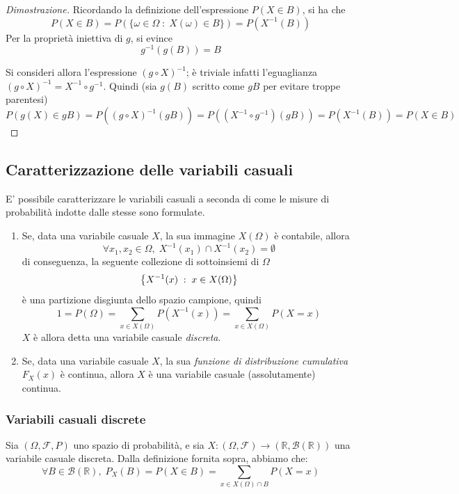 \documentclass{article}
\begin{document}
        \begin{proof}[Dimostrazione]
            Ricordando la definizione dell'espressione $P(X \in B)$, si ha che
            \[
                P(X \in B) = P(\{ \omega \in \Omega \; : \; X(\omega) \in B \}) = P(X^{-1}(B))
            \]
            Per la proprietà iniettiva di $g$, si evince
            \[
                g^{-1}(g(B)) = B
            \]

            Si consideri allora l'espressione $(g \circ X)^{-1}$; è triviale infatti l'eguaglianza $(g \circ X)^{-1} = X^{-1} \circ g^{-1}$. 
            Quindi (sia $g(B)$ scritto come $gB$ per evitare troppe parentesi)
            \[
                P(g(X) \in gB) = P((g \circ X)^{-1}(gB)) = P((X^{-1} \circ g^{-1}) (gB)) = P(X^{-1}(B)) = P(X \in B)
            \]
        \end{proof}


        \subsection{Caratterizzazione delle variabili casuali}
            E' possibile caratterizzare le variabili casuali a seconda di come le misure di probabilità indotte dalle stesse sono formulate.

            \begin{enumerate}
                \item Se, data una variabile casuale $X$, la sua immagine $X(\Omega)$ è contabile, allora
                \[
                    \forall x_1, x_2 \in \Omega, \; X^{-1}(x_1) \cap X^{-1}(x_2) = \emptyset
                \]
                di conseguenza, la seguente collezione di sottoinsiemi di $\Omega$
                \[
                    \qty{X^{-1}(x) \; : \; x \in X(\Omega)}
                \]
                è una partizione disgiunta dello spazio campione, quindi
                \[
                    1 = P(\Omega) = \sum_{x \in X(\Omega)} P(X^{-1}(x)) = \sum_{x \in X(\Omega)} P(X = x)
                \]
                $X$ è allora detta una variabile casuale \textit{discreta}.

                \item Se, data una variabile casuale $X$, la sua \textit{funzione di distribuzione cumulativa} $F_{X}(x)$ è continua, allora $X$ è una variabile casuale (assolutamente) continua.
            \end{enumerate}

            \subsubsection{Variabili casuali discrete}
                Sia $(\Omega, \mathcal{F}, P)$ uno spazio di probabilità, e sia $X: (\Omega, \mathcal{F}) \rightarrow (\mathbb{R}, \mathcal{B}(\mathbb{R}))$ una variabile casuale discreta.
                Dalla definizione fornita sopra, abbiamo che:
                \[
                    \forall B \in \mathcal{B}(\mathbb{R}), \; P_{X}(B) = P(X \in B) = \sum_{x \in X(\Omega) \cap B} P(X = x)
                \]
\end{document}
